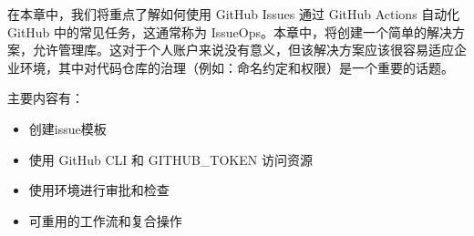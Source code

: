 在本章中，我们将重点了解如何使用 GitHub Issues 通过 GitHub Actions 自动化 GitHub 中的常见任务，这通常称为 IssueOps。本章中，将创建一个简单的解决方案，允许管理库。这对于个人账户来说没有意义，但该解决方案应该很容易适应企业环境，其中对代码仓库的治理（例如：命名约定和权限）是一个重要的话题。

主要内容有：

\begin{itemize}
\item 
创建issue模板

\item 
使用 GitHub CLI 和 GITHUB\_TOKEN 访问资源

\item 
使用环境进行审批和检查

\item 
可重用的工作流和复合操作
\end{itemize}
